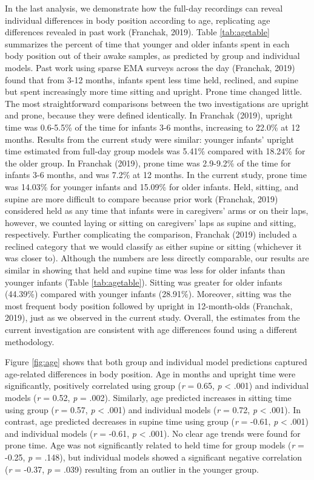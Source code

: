 \documentclass[
  man]{apa6}
\begin{document}
In the last analysis, we demonstrate how the full-day recordings can reveal individual differences in body position according to age, replicating age differences revealed in past work (Franchak, 2019). Table \ref{tab:agetable} summarizes the percent of time that younger and older infants spent in each body position out of their awake samples, as predicted by group and individual models. Past work using sparse EMA surveys across the day (Franchak, 2019) found that from 3-12 months, infants spent less time held, reclined, and supine but spent increasingly more time sitting and upright. Prone time changed little. The most straightforward comparisons between the two investigations are upright and prone, because they were defined identically. In Franchak (2019), upright time was 0.6-5.5\% of the time for infants 3-6 months, increasing to 22.0\% at 12 months. Results from the current study were similar: younger infants' upright time estimated from full-day group models was 5.41\% compared with 18.24\% for the older group. In Franchak (2019), prone time was 2.9-9.2\% of the time for infants 3-6 months, and was 7.2\% at 12 months. In the current study, prone time was 14.03\% for younger infants and 15.09\% for older infants. Held, sitting, and supine are more difficult to compare because prior work (Franchak, 2019) considered held as any time that infants were in caregivers' arms or on their laps, however, we counted laying or sitting on caregivers' laps as supine and sitting, respectively. Further complicating the comparison, Franchak (2019) included a reclined category that we would classify as either supine or sitting (whichever it was closer to). Although the numbers are less directly comparable, our results are similar in showing that held and supine time was less for older infants than younger infants (Table \ref{tab:agetable}). Sitting was greater for older infants (44.39\%) compared with younger infants (28.91\%). Moreover, sitting was the most frequent body position followed by upright in 12-month-olds (Franchak, 2019), just as we observed in the current study. Overall, the estimates from the current investigation are consistent with age differences found using a different methodology.

Figure \ref{fig:age} shows that both group and individual model predictions captured age-related differences in body position. Age in months and upright time were significantly, positively correlated using group (\emph{r} = 0.65, \emph{p} \textless{} .001) and individual models (\emph{r} = 0.52, \emph{p} = .002). Similarly, age predicted increases in sitting time using group (\emph{r} = 0.57, \emph{p} \textless{} .001) and individual models (\emph{r} = 0.72, \emph{p} \textless{} .001). In contrast, age predicted decreases in supine time using group (\emph{r} = -0.61, \emph{p} \textless{} .001) and individual models (\emph{r} = -0.61, \emph{p} \textless{} .001). No clear age trends were found for prone time. Age was not significantly related to held time for group models (\emph{r} = -0.25, \emph{p} = .148), but individual models showed a significant negative correlation (\emph{r} = -0.37, \emph{p} = .039) resulting from an outlier in the younger group.
\end{document}
